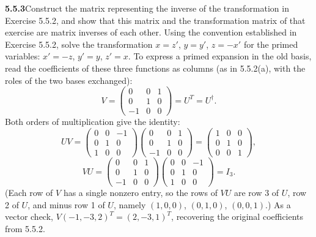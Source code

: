 \par\bigskip
\noindent\textbf{5.5.3}\quad Construct the matrix representing the inverse of
the transformation in Exercise 5.5.2, and show that this matrix and the
transformation matrix of that exercise are matrix inverses of each other.
\solution
Using the convention established in Exercise 5.5.2, solve the
transformation $x=z'$, $y=y'$, $z=-x'$ for the primed variables:
$x'=-z$, $y'=y$, $z'=x$. To express a primed expansion in the old basis,
read the coefficients of these three functions as columns (as in
5.5.2(a), with the roles of the two bases exchanged):
\[
\boxed{V=\begin{pmatrix}0&0&1\\0&1&0\\-1&0&0\end{pmatrix}=U^T=U^\dagger.}
\]
Both orders of multiplication give the identity:
\[
UV=\begin{pmatrix}0&0&-1\\0&1&0\\1&0&0\end{pmatrix}
\begin{pmatrix}0&0&1\\0&1&0\\-1&0&0\end{pmatrix}
=\begin{pmatrix}1&0&0\\0&1&0\\0&0&1\end{pmatrix},
\]
\[
VU=\begin{pmatrix}0&0&1\\0&1&0\\-1&0&0\end{pmatrix}
\begin{pmatrix}0&0&-1\\0&1&0\\1&0&0\end{pmatrix}=I_3.
\]
(Each row of $V$ has a single nonzero entry, so the rows of $VU$ are
row 3 of $U$, row 2 of $U$, and minus row 1 of $U$, namely
$(1,0,0)$, $(0,1,0)$, $(0,0,1)$.)
As a vector check, $V(-1,-3,2)^T=(2,-3,1)^T$, recovering the original
coefficients from 5.5.2.

